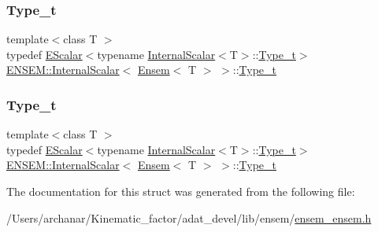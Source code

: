 \subsubsection{\texorpdfstring{Type\_t}{Type\_t}\hspace{0.1cm}{\footnotesize\ttfamily [1/2]}}
{\footnotesize\ttfamily template$<$class T $>$ \\
typedef \mbox{\hyperlink{classENSEM_1_1EScalar}{E\+Scalar}}$<$typename \mbox{\hyperlink{structENSEM_1_1InternalScalar}{Internal\+Scalar}}$<$T$>$\+::\mbox{\hyperlink{structENSEM_1_1InternalScalar_3_01Ensem_3_01T_01_4_01_4_ab389a1f835bfbbf4a47aefe1c076d832}{Type\+\_\+t}}$>$ \mbox{\hyperlink{structENSEM_1_1InternalScalar}{E\+N\+S\+E\+M\+::\+Internal\+Scalar}}$<$ \mbox{\hyperlink{classENSEM_1_1Ensem}{Ensem}}$<$ T $>$ $>$\+::\mbox{\hyperlink{structENSEM_1_1InternalScalar_3_01Ensem_3_01T_01_4_01_4_ab389a1f835bfbbf4a47aefe1c076d832}{Type\+\_\+t}}}

\mbox{\label{structENSEM_1_1InternalScalar_3_01Ensem_3_01T_01_4_01_4_ab389a1f835bfbbf4a47aefe1c076d832}} 
\subsubsection{\texorpdfstring{Type\_t}{Type\_t}\hspace{0.1cm}{\footnotesize\ttfamily [2/2]}}
{\footnotesize\ttfamily template$<$class T $>$ \\
typedef \mbox{\hyperlink{classENSEM_1_1EScalar}{E\+Scalar}}$<$typename \mbox{\hyperlink{structENSEM_1_1InternalScalar}{Internal\+Scalar}}$<$T$>$\+::\mbox{\hyperlink{structENSEM_1_1InternalScalar_3_01Ensem_3_01T_01_4_01_4_ab389a1f835bfbbf4a47aefe1c076d832}{Type\+\_\+t}}$>$ \mbox{\hyperlink{structENSEM_1_1InternalScalar}{E\+N\+S\+E\+M\+::\+Internal\+Scalar}}$<$ \mbox{\hyperlink{classENSEM_1_1Ensem}{Ensem}}$<$ T $>$ $>$\+::\mbox{\hyperlink{structENSEM_1_1InternalScalar_3_01Ensem_3_01T_01_4_01_4_ab389a1f835bfbbf4a47aefe1c076d832}{Type\+\_\+t}}}



The documentation for this struct was generated from the following file\+:\begin{DoxyCompactItemize}
\item 
/\+Users/archanar/\+Kinematic\+\_\+factor/adat\+\_\+devel/lib/ensem/\mbox{\hyperlink{lib_2ensem_2ensem__ensem_8h}{ensem\+\_\+ensem.\+h}}\end{DoxyCompactItemize}
